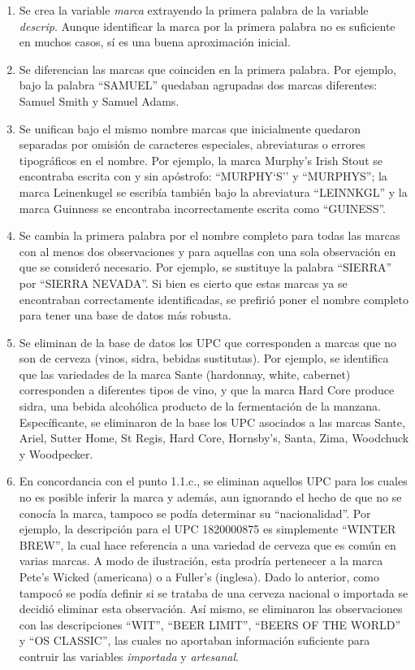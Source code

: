 \documentclass[
]{article}
\providecommand{\tightlist}{%
  \setlength{\itemsep}{0pt}\setlength{\parskip}{0pt}}
\begin{document}
\begin{enumerate}
\def\labelenumi{\arabic{enumi}.}
\tightlist
\item
  Se crea la variable \emph{marca} extrayendo la primera palabra de la
  variable \emph{descrip}. Aunque identificar la marca por la primera
  palabra no es suficiente en muchos casos, sí es una buena aproximación
  inicial.
\item
  Se diferencian las marcas que coinciden en la primera palabra. Por
  ejemplo, bajo la palabra ``SAMUEL'' quedaban agrupadas dos marcas
  diferentes: Samuel Smith y Samuel Adams.
\item
  Se unifican bajo el mismo nombre marcas que inicialmente quedaron
  separadas por omisión de caracteres especiales, abreviaturas o errores
  tipográficos en el nombre. Por ejemplo, la marca Murphy's Irish Stout
  se encontraba escrita con y sin apóstrofo: ``MURPHY`S'' y ``MURPHYS'';
  la marca Leinenkugel se escribía también bajo la abreviatura
  ``LEINNKGL'' y la marca Guinness se encontraba incorrectamente escrita
  como ``GUINESS''.
\item
  Se cambia la primera palabra por el nombre completo para todas las
  marcas con al menos dos observaciones y para aquellas con una sola
  observación en que se consideró necesario. Por ejemplo, se sustituye
  la palabra ``SIERRA'' por ``SIERRA NEVADA''. Si bien es cierto que
  estas marcas ya se encontraban correctamente identificadas, se
  prefirió poner el nombre completo para tener una base de datos más
  robusta.
\item
  Se eliminan de la base de datos los UPC que corresponden a marcas que
  no son de cerveza (vinos, sidra, bebidas sustitutas). Por ejemplo, se
  identifica que las variedades de la marca Sante (hardonnay, white,
  cabernet) corresponden a diferentes tipos de vino, y que la marca Hard
  Core produce sidra, una bebida alcohólica producto de la fermentación
  de la manzana. Específicante, se eliminaron de la base los UPC
  asociados a las marcas Sante, Ariel, Sutter Home, St Regis, Hard Core,
  Hornsby's, Santa, Zima, Woodchuck y Woodpecker.
\item
  En concordancia con el punto 1.1.c., se eliminan aquellos UPC para los
  cuales no es posible inferir la marca y además, aun ignorando el hecho
  de que no se conocía la marca, tampoco se podía determinar su
  ``nacionalidad''. Por ejemplo, la descripción para el UPC 1820000875
  es simplemente ``WINTER BREW'', la cual hace referencia a una variedad
  de cerveza que es común en varias marcas. A modo de ilustración, esta
  prodría pertenecer a la marca Pete's Wicked (americana) o a Fuller's
  (inglesa). Dado lo anterior, como tampocó se podía definir si se
  trataba de una cerveza nacional o importada se decidió eliminar esta
  observación. Así mismo, se eliminaron las observaciones con las
  descripciones ``WIT'', ``BEER LIMIT'', ``BEERS OF THE WORLD'' y ``OS
  CLASSIC'', las cuales no aportaban información suficiente para
  contruir las variables \emph{importada} y \emph{artesanal}.
\end{enumerate}
\end{document}
